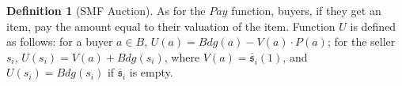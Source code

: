 \documentclass[letterpaper]{article} %
\theoremstyle{definition}
\newtheorem{definition}{Definition}
\newcommand{\Pay}{\mathit{Pay}}
\newcommand{\munyque}[1]{{[\color{red}#1]}}
\newcommand{\munyquem}[1]{{\color{blue}#1}}
\begin{document}
\begin{definition}[SMF Auction]
  As for the $\Pay$ function, buyers, if they get an item, pay the amount equal to their valuation of the item.
Function $U$ is defined as follows: for a buyer $a \in B$, $U(a) = Bdg(a) - V(a)\cdot P(a)$; %
for the seller $s_i$, $U(s_i) = V(a) + Bdg(s_i)$, where $V(a) = \overline{\mathfrak{s}}_i (1)$, and $U(s_i) = Bdg(s_i)$ if $\overline{\mathfrak{s}}_i$ is empty.
\end{definition}
\end{document}

